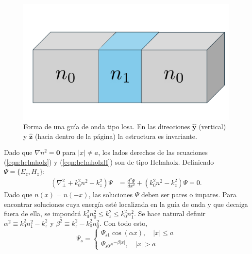 \begin{figure}[H]
	\centering
	\includegraphics[width=0.6\linewidth]{media/slab.pdf}
	\caption[Forma de una guía de onda tipo losa.]{Forma de una guía de onda tipo losa. En las direcciones $\mathbf{\hat{y}}$ (vertical) y $\mathbf{\hat{z}}$ (hacia dentro de la página) la estructura es invariante.}
\end{figure}

Dado que $\nabla n^2 = \textbf{0}$ para $|x| \neq a$, los lados derechos de las ecuaciones (\ref{eqn:helmholz}) y (\ref{eqn:helmholzH}) son de tipo Helmholz. Definiendo $\Psi = \{E_z, H_z\} $:
\begin{align*}
	(\nabla_\perp^2  + k_0^2n^2 - k_z^2) \Psi  &=  \frac{d^2\Psi}{dx^2} + (k_0^2n^2 - k_z^2) \Psi  = 0.
\end{align*}
Dado que $n(x)=n(-x)$, las soluciones $\Psi$ deben ser pares o impares. Para encontrar soluciones cuya energía esté localizada en la guía de onda y que decaiga fuera de ella, se impondrá $k_0^2n_0^2 \le k_z^2 \le k_0^2n_1^2$. Se hace natural definir $\alpha^2\equiv k_0^2n_1^2-k_z^2$ y $\beta^2\equiv k_z^2 - k_0^2n_0^2$. Con todo esto, 
\begin{equation*}
	\Psi_s = \left\{\begin{matrix}
	\Psi_{s1}\cos(\alpha x),\quad |x|\le a
	\\
	\Psi_{s0}e^{-\beta|x|}, \quad |x|>a
	\end{matrix}\right.
\end{equation*}

